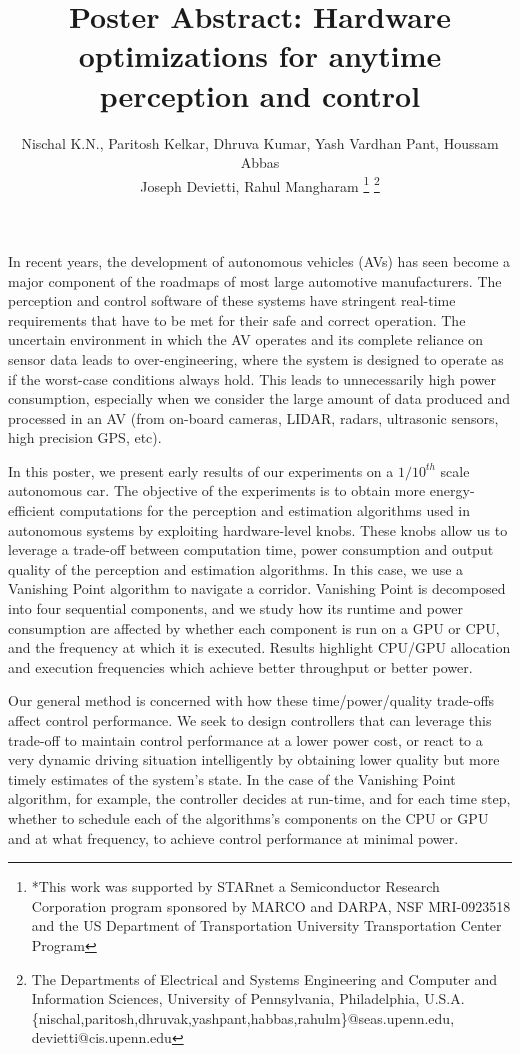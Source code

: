 \documentclass[a4paper, 10pt, conference]{ieeeconf}      %
\title{\LARGE \bf
	Poster Abstract: Hardware optimizations for anytime perception and control
}
\author{ Nischal K.N., Paritosh Kelkar, Dhruva Kumar, Yash Vardhan Pant, Houssam Abbas\\
	Joseph Devietti, Rahul Mangharam%
	\thanks{*This work was supported by STARnet a Semiconductor Research
		Corporation program sponsored by MARCO and DARPA, NSF MRI-0923518 and the US Department of Transportation University Transportation Center Program}%
	\thanks{The Departments of Electrical and Systems Engineering and Computer and Information Sciences, University of Pennsylvania, Philadelphia, U.S.A.
		{\small
			 \{nischal,paritosh,dhruvak,yashpant,habbas,rahulm\}@seas.upenn.edu, devietti@cis.upenn.edu}}%
}
\begin{document}
	
\maketitle
\thispagestyle{empty}
\pagestyle{empty}

In recent years, the development of autonomous vehicles (AVs) has seen become a major component of the roadmaps of most large automotive manufacturers. 
The perception and control software of these systems have stringent real-time requirements that have to be met for their safe and correct operation.
The uncertain environment in which the AV operates and its complete reliance on sensor data leads to over-engineering, where the system is designed to operate as if the worst-case conditions always hold.
This leads to unnecessarily high power consumption, especially when we consider the large amount of data produced and processed in an AV (from on-board cameras, LIDAR, radars, ultrasonic sensors, high precision GPS, etc). 

In this poster, we present early results of our experiments on a $1/10^{th}$ scale autonomous car. 
The objective of the experiments is to obtain more energy-efficient computations for the perception and estimation algorithms used in autonomous systems by exploiting hardware-level knobs. 
These knobs allow us to leverage a trade-off between computation time, power consumption and output quality of the perception and estimation algorithms. 
In this case, we use a Vanishing Point algorithm to navigate a corridor. 
Vanishing Point is decomposed into four sequential components, and we study how its runtime and power consumption are affected by whether each component is run on a GPU or CPU, and the frequency at which it is executed.
Results highlight CPU/GPU allocation and execution frequencies which achieve better throughput or better power.

Our general method is concerned with how these time/power/quality trade-offs affect control performance. 
We seek to design controllers that can leverage this trade-off to maintain control performance at a lower power cost, or react to a very dynamic driving situation intelligently by obtaining lower quality but more timely estimates of the system's state.   
In the case of the Vanishing Point algorithm, for example, the controller decides at run-time, and for each time step, whether to schedule each of the algorithms's components on the CPU or GPU and at what frequency, to achieve control performance at minimal power.
	
\end{document}
